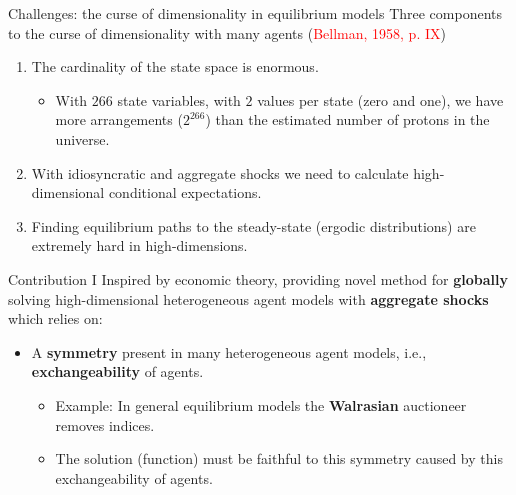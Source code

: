 \documentclass[aspectratio=169,10pt]{beamer}
\newcommand{\emphcolor}[1]{\textbf{\textcolor{emphcolorval}{#1}}}
\begin{document}

\begin{frame}{Challenges: the curse of dimensionality in equilibrium models}
	 Three components to the curse of dimensionality with many agents (\textcolor{red}{Bellman, 1958, p. IX})\vspace{0.1in}

		      \begin{enumerate}
			      \item The cardinality of the state space is enormous.\medskip
			       \begin{itemize}

			        \item With $266$ state variables, with $2$ values per state (zero and one), we have more arrangements ($2^{266}$) than the estimated number of protons in the universe.\vspace{0.1in} 
		        \end{itemize}

			      \item With idiosyncratic and aggregate shocks we need to calculate high-dimensional conditional expectations.\vspace{0.1in}
			      
			      \item Finding equilibrium paths to the steady-state (ergodic distributions) are extremely hard in high-dimensions.
		      \end{enumerate}
\end{frame}

\begin{frame}{Contribution I}
	Inspired by economic theory, providing novel method for \emphcolor{globally} solving high-dimensional heterogeneous agent models with \emphcolor{aggregate shocks} which relies on:\vspace{0.1in}
	\begin{itemize}
		\item A \emphcolor{symmetry} present in many heterogeneous agent models, i.e., \emphcolor{exchangeability} of agents.\vspace{0.1in}
		\begin{itemize}
			\item Example: In general equilibrium models the \emphcolor{Walrasian} auctioneer removes indices.\vspace{0.1in}
			\item The solution (function) must be faithful to this symmetry caused by this exchangeability of agents.
		\end{itemize}
	\end{itemize}
		
\end{frame}
\end{document}
